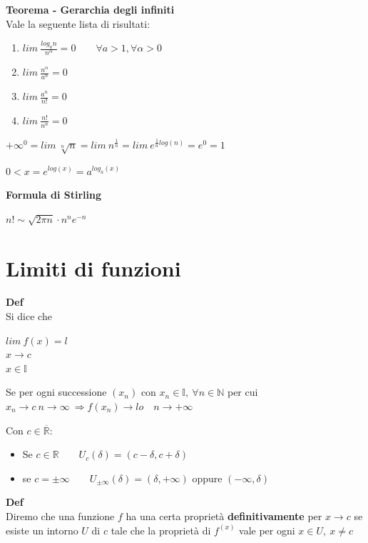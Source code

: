 \documentclass[12pt, a4paper]{article}
\begin{document}
    \textbf{Teorema - Gerarchia degli infiniti}\\Vale la seguente lista di risultati:
    \begin{enumerate}
        \item $lim\ \frac{log_{a}n}{n^{\alpha}}=0\qquad\forall a>1,\forall\alpha>0$
        \item $lim\ \frac{n^{\alpha}}{a^{n}}=0$
        \item $lim\ \frac{a^{n}}{n!}=0$
        \item $lim\ \frac{n!}{n^{n}}=0$
    \end{enumerate}

$+\infty^{0}=lim\ \sqrt[n]{n}=lim\ n^{\frac{1}{n}}=lim\ e^{\frac{1}{n}log(n)}=e^{0}=1$

$0<x=e^{log(x)}=a^{log_{a}(x)}$

    \textbf{Formula di Stirling}
    \begin{center}
        $n!\sim\sqrt{2\pi n}\cdot n^{n}e^{-n}$
    \end{center}

    \newpage
    \section{Limiti di funzioni}
    \textbf{Def}\\Si dice che
    \begin{center}
        $lim\ f(x)=l$\\
        $x\to c\qquad\qquad$\\
        $x\in\mathbb{I}\qquad\qquad$
    \end{center}
    Se per ogni successione $(x_{n})$ con $x_{n}\in\mathbb{I},\ \forall n\in\mathbb{N}$ per cui $x_{n}
\to c\ n\to\infty\ \Rightarrow f(x_{n})\to lo\quad n\to+\infty$

    Con $c\in\overline{\mathbb{R}}$:
    \begin{itemize}
        \item Se $c\in\mathbb{R}\qquad U_{c}(\delta)=(c-\delta,c+\delta)$
        \item se $c=\pm\infty\qquad U_{\pm\infty}(\delta)=(\delta,+\infty)$ oppure $(-\infty,\delta)$
    \end{itemize}

    \textbf{Def}\\Diremo che una funzione $f$ ha una certa proprietà \textbf{definitivamente} per $x\to c$
    se esiste un intorno $U$ di $c$ tale che la proprietà di $f^{(x)}$ vale per ogni $x\in U,\ x\neq c$
\end{document}

